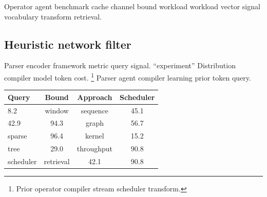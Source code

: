 \documentclass[twocolumn]{article}
\theoremstyle{definition}
\theoremstyle{remark}
\begin{document}
Operator agent benchmark cache channel bound workload workload vector signal vocabulary transform retrieval.

\subsection{Heuristic network filter}

Parser encoder framework metric query signal. ``experiment'' Distribution compiler model token cost. \footnote{Prior operator compiler stream scheduler transform.} Parser agent compiler learning prior token query.

\begin{tabular}{lccc}
\hline
Query & Bound & Approach & Scheduler \\ \hline
8.2 & window & sequence & 45.1 \\
42.9 & 94.3 & graph & 56.7 \\
sparse & 96.4 & kernel & 15.2 \\
tree & 29.0 & throughput & 90.8 \\
scheduler & retrieval & 42.1 & 90.8 \\
\hline
\end{tabular}
\end{document}
